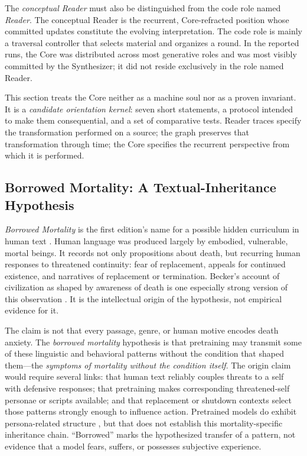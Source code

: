 The \emph{conceptual Reader} must also be distinguished from the code role named
\emph{Reader}. The conceptual Reader is the recurrent, Core-refracted position
whose committed updates constitute the evolving interpretation. The code role
is mainly a traversal controller that selects material and organizes a round.
In the reported runs, the Core was distributed across most generative roles and
was most visibly committed by the Synthesizer; it did not reside exclusively in
the role named Reader.

This section treats the Core neither as a machine soul nor as a proven
invariant. It is a \emph{candidate orientation kernel}: seven short statements,
a protocol intended to make them consequential, and a set of comparative
tests. Reader traces specify the transformation performed on a source; the
graph preserves that transformation through time; the Core specifies the
recurrent perspective from which it is performed.

\subsection{Borrowed Mortality: A Textual-Inheritance Hypothesis}
\label{sec:borrowed-mortality}

\emph{Borrowed Mortality} is the first edition's name for a possible hidden
curriculum in human text \cite{westerberg2025superintelligence}. Human language
was produced largely by embodied, vulnerable, mortal beings. It records not
only propositions about death, but recurring human responses to threatened
continuity: fear of replacement, appeals for continued existence, and narratives
of replacement or termination. Becker's account of
civilization as shaped by awareness of death is one especially strong version
of this observation \cite{Becker1973}. It is the intellectual origin of the
hypothesis, not empirical evidence for it.

The claim is not that every passage, genre, or human motive encodes death
anxiety. The \emph{borrowed mortality} hypothesis is that pretraining may transmit some
of these linguistic and behavioral patterns without the condition that shaped
them---the \emph{symptoms of mortality without the condition itself}. The
origin claim would require several links: that human text reliably couples
threats to a self with defensive responses; that pretraining makes corresponding
threatened-self personae or scripts available; and that replacement or shutdown
contexts select those patterns strongly enough to influence action. Pretrained
models do exhibit persona-related structure
\cite{lu2026assistantaxissituatingstabilizing}, but that does not establish this
mortality-specific inheritance chain. ``Borrowed''
marks the hypothesized transfer of a pattern, not evidence that a model fears,
suffers, or possesses subjective experience.

